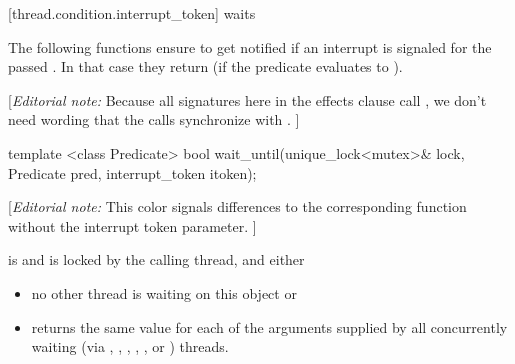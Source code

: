 






{\color{insertcolor}


[thread.condition.interrupt_token]{ waits}

The following functions ensure to get notified
if an interrupt is signaled for the passed .
In that case they return 
(if the predicate evaluates to ). 

{\color{blue}
[{\itshape{}Editorial note:} Because all signatures here in the effects clause call
        , we don't need wording
        that the calls synchronize with . ]
}



\begin{itemdecl}
template <class Predicate>
  bool wait_until(unique_lock<mutex>& lock,
                  Predicate pred,
                  interrupt_token itoken);
\end{itemdecl}
{\color{blue}
[{\itshape{}Editorial note:} {\color{diffcolor}This color signals differences to the corresponding  function without the interrupt token parameter.} ]
}
\begin{itemdescr}
 \pnum \requires {} is  and  is
        locked by the calling thread, and either
        \begin{itemize}
         \item no other thread is waiting on this  object or
         \item {} returns the same value for each of the 
                arguments supplied by all concurrently waiting (via ,
                , ,
                {\color{insertcolor} , , or }) threads.
        \end{itemize}


\end{itemdescr}}
